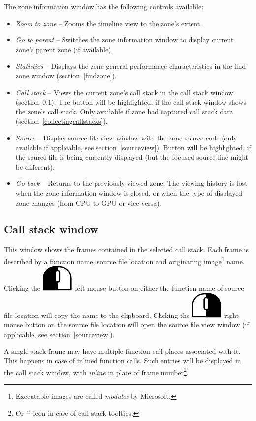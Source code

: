 \documentclass[hidelinks,titlepage,a4paper]{article}
\newcommand{\LMB}{\includegraphics[height=.8\baselineskip]{icons/lmb}}
\newcommand{\RMB}{\includegraphics[height=.8\baselineskip]{icons/rmb}}
\begin{document}
The zone information window has the following controls available:

\begin{itemize}
\item \emph{\faMicroscope{} Zoom to zone} -- Zooms the timeline view to the zone's extent.
\item \emph{\faArrowUp{} Go to parent} -- Switches the zone information window to display current zone's parent zone (if available).
\item \emph{\faChartBar{} Statistics} -- Displays the zone general performance characteristics in the find zone window (section~\ref{findzone}).
\item \emph{\faAlignJustify{} Call stack} -- Views the current zone's call stack in the call stack window (section~\ref{callstackwindow}). The button will be highlighted, if the call stack window shows the zone's call stack. Only available if zone had captured call stack data (section~\ref{collectingcallstacks}).
\item \emph{\faFile*{} Source} -- Display source file view window with the zone source code (only available if applicable, see section~\ref{sourceview}). Button will be highlighted, if the source file is being currently displayed (but the focused source line might be different).
\item \emph{\faArrowLeft{} Go back} -- Returns to the previously viewed zone. The viewing history is lost when the zone information window is closed, or when the type of displayed zone changes (from CPU to GPU or vice versa).
\end{itemize}

\subsection{Call stack window}
\label{callstackwindow}

This window shows the frames contained in the selected call stack. Each frame is described by a function name, source file location and originating image\footnote{Executable images are called \emph{modules} by Microsoft.} name. Clicking the \LMB{}~left mouse button on either the function name of source file location will copy the name to the clipboard. Clicking the \RMB{}~right mouse button on the source file location will open the source file view window (if applicable, see section~\ref{sourceview}).

A single stack frame may have multiple function call places associated with it. This happens in case of inlined function calls. Such entries will be displayed in the call stack window, with \emph{inline} in place of frame number\footnote{Or '\faCaretRight{}'~icon in case of call stack tooltips.}.
\end{document}
